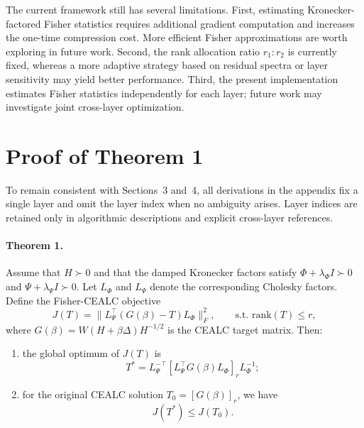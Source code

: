 \documentclass[a4paper,fleqn]{cas-dc}
\begin{document}
The current framework still has several limitations. First, estimating Kronecker-factored Fisher statistics requires additional gradient computation and increases the one-time compression cost. More efficient Fisher approximations are worth exploring in future work. Second, the rank allocation ratio $r_1:r_2$ is currently fixed, whereas a more adaptive strategy based on residual spectra or layer sensitivity may yield better performance. Third, the present implementation estimates Fisher statistics independently for each layer; future work may investigate joint cross-layer optimization.

\appendix

\section{Proof of Theorem 1}

To remain consistent with Sections~3 and~4, all derivations in the appendix fix a single layer and omit the layer index when no ambiguity arises. Layer indices are retained only in algorithmic descriptions and explicit cross-layer references.

\paragraph{Theorem 1.}
Assume that $H \succ 0$ and that the damped Kronecker factors satisfy $\Phi + \lambda_\Phi I \succ 0$ and $\Psi + \lambda_\Psi I \succ 0$. Let $L_\Phi$ and $L_\Psi$ denote the corresponding Cholesky factors. Define the Fisher-CEALC objective
\begin{equation}
J(T) = \|L_\Psi^{\top}(G(\beta)-T)L_\Phi\|_F^2,
\qquad \text{s.t. } \mathrm{rank}(T) \le r,
\end{equation}
where $G(\beta) = W(H+\beta\Delta)H^{-1/2}$ is the CEALC target matrix. Then:
\begin{enumerate}[leftmargin=1.5em,label=(\arabic*)]
    \item the global optimum of $J(T)$ is
    \begin{equation}
    T^* = L_\Psi^{-\top}[L_\Psi^{\top}G(\beta)L_\Phi]_r L_\Phi^{-1};
    \end{equation}
    \item for the original CEALC solution $T_0=[G(\beta)]_r$, we have
    \begin{equation}
    J(T^*) \le J(T_0).
    \end{equation}
\end{enumerate}
\end{document}
